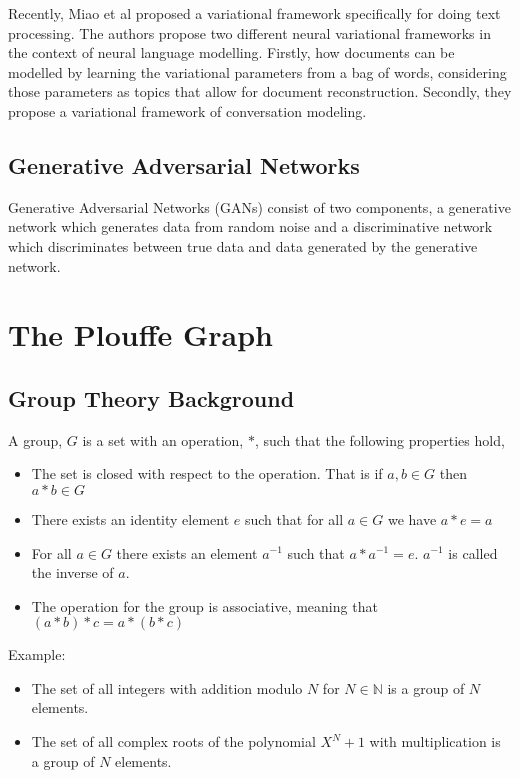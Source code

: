 \documentclass[a4paper,12pt]{article}
\begin{document}
Recently, Miao et al proposed a variational framework specifically for doing text processing. The authors propose two different neural variational frameworks in the context of neural language modelling.  Firstly, how documents can be modelled by learning the variational parameters from a bag of words, considering those parameters as topics that allow for document reconstruction. Secondly, they propose a variational framework of conversation modeling.


\subsection{Generative Adversarial Networks}

Generative Adversarial Networks (GANs) consist of two components, a generative network which generates data from random noise and a discriminative network which discriminates between true data and data generated by the generative network. 






\section{The Plouffe Graph}
\subsection{Group Theory Background}

A group, \(G\) is a set with an operation, \(\ast\), such that the following properties hold, 
\begin{itemize}
\item The set is closed with respect to the operation. That is if \(a,b \in G\) then \(a \ast b \in G\)
\item There exists an identity element \(e\) such that for all \(a  \in G\) we have \(a \ast e = a\)
\item For all \(a \in G\) there exists an element \( a^{-1} \) such that \(a \ast a^{-1} = e\). 
\(a^{-1}\) is called the inverse of \(a\).
\item The operation for the group is associative, meaning that \( (a \ast b) \ast c = a \ast ( b \ast c) \)
\end{itemize}

Example:

\begin{itemize} 
\item The set of all integers with addition modulo \(N\) for \(N \in \mathbb{N}\) is a group of \(N\) elements.

\item The set of all complex roots of the polynomial \(X^{N} + 1\) with multiplication is a group of \(N\) elements. 
\end{itemize}
\end{document}
